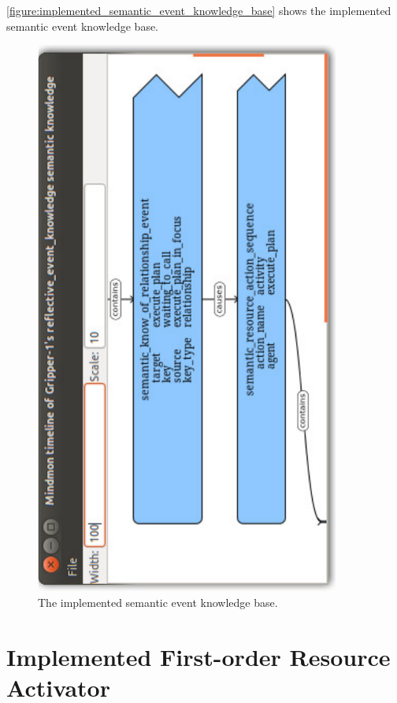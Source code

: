 {\mbox{\autoref{figure:implemented_semantic_event_knowledge_base}}} shows the
implemented semantic event knowledge base.
\begin{figure}
\includegraphics[width=10cm]{gfx/implemented_semantic_event_knowledge_base}
\caption[The implemented semantic event knowledge base.]{The
  implemented semantic event knowledge base.}
\label{figure:implemented_semantic_event_knowledge_base}
\end{figure}

\section{Implemented First-order Resource Activator}

